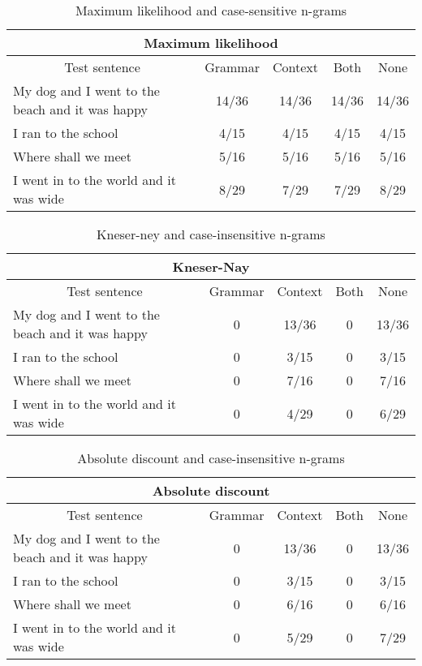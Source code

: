 \vspace{-1cm}
\begin{table}[H]
\centering
\caption{Maximum likelihood and case-sensitive n-grams}
{\scriptsize
\begin{tabular}{ |p{}|c|c|c|c| }
	\hline
	\multicolumn{5}{|c|}{Maximum likelihood} \\
	\hline
	\multicolumn{1}{|c|}{Test sentence} & Grammar & Context & Both & None \\
	\hline
	My dog and I went to the beach and it was happy & 14/36 & 14/36 & 14/36 & 14/36 \\
	\hline
	I ran to the school & 4/15 & 4/15 & 4/15 & 4/15 \\
	\hline
	Where shall we meet & 5/16 & 5/16 & 5/16 & 5/16 \\
	\hline
	I went in to the world and it was wide & 8/29 & 7/29 & 7/29 & 8/29 \\
	\hline
\end{tabular}
}
\end{table}
\vspace{-1cm}



\begin{table}[H]
\centering
\caption{Kneser-ney and case-insensitive n-grams}
{\scriptsize
\begin{tabular}{ |p{}|c|c|c|c| }
	\hline
	\multicolumn{5}{|c|}{Kneser-Nay} \\
	\hline
	\multicolumn{1}{|c|}{Test sentence} & Grammar & Context & Both & None \\
	\hline
	My dog and I went to the beach and it was happy & 0 & 13/36 & 0 & 13/36 \\
	\hline
	I ran to the school & 0 & 3/15 & 0 & 3/15 \\
	\hline
	Where shall we meet & 0 & 7/16 & 0 & 7/16 \\
	\hline
	I went in to the world and it was wide & 0 & 4/29 & 0 & 6/29 \\
	\hline
\end{tabular}
}
\end{table}

\vspace{-1cm}
\begin{table}[H]
\centering
\caption{Absolute discount and case-insensitive n-grams}
{\scriptsize
\begin{tabular}{ |p{}|c|c|c|c| }
	\hline
	\multicolumn{5}{|c|}{Absolute discount} \\
	\hline
	\multicolumn{1}{|c|}{Test sentence} & Grammar & Context & Both & None \\
	\hline
	My dog and I went to the beach and it was happy & 0 & 13/36 & 0 & 13/36 \\
	\hline
	I ran to the school & 0 & 3/15 & 0 & 3/15 \\
	\hline
	Where shall we meet & 0 & 6/16 & 0 & 6/16 \\
	\hline
	I went in to the world and it was wide & 0 & 5/29 & 0 & 7/29 \\
	\hline
\end{tabular}
}
\end{table}

